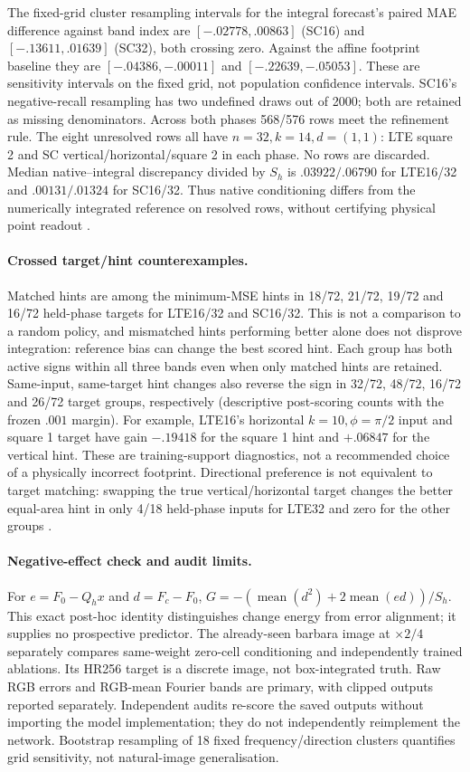 The fixed-grid cluster resampling intervals for the integral forecast's paired MAE difference against band index are $[-.02778,.00863]$ (SC16) and $[-.13611,.01639]$ (SC32), both crossing zero. Against the affine footprint baseline they are $[-.04386,-.00011]$ and $[-.22639,-.05053]$. These are sensitivity intervals on the fixed grid, not population confidence intervals. SC16's negative-recall resampling has two undefined draws out of 2000; both are retained as missing denominators. Across both phases 568/576 rows meet the refinement rule. The eight unresolved rows all have $n=32,k=14,d=(1,1)$: LTE square 2 and SC vertical/horizontal/square 2 in each phase. No rows are discarded. Median native--integral discrepancy divided by $S_h$ is $.03922/.06790$ for LTE16/32 and $.00131/.01324$ for SC16/32. Thus native conditioning differs from the numerically integrated reference on resolved rows, without certifying physical point readout .

\paragraph{Crossed target/hint counterexamples.}
Matched hints are among the minimum-MSE hints in 18/72, 21/72, 19/72 and 16/72 held-phase targets for LTE16/32 and SC16/32. This is not a comparison to a random policy, and mismatched hints performing better alone does not disprove integration: reference bias can change the best scored hint. Each group has both active signs within all three bands even when only matched hints are retained. Same-input, same-target hint changes also reverse the sign in 32/72, 48/72, 16/72 and 26/72 target groups, respectively (descriptive post-scoring counts with the frozen $.001$ margin). For example, LTE16's horizontal $k=10,\phi=\pi/2$ input and square 1 target have gain $-.19418$ for the square 1 hint and $+.06847$ for the vertical hint. These are training-support diagnostics, not a recommended choice of a physically incorrect footprint. Directional preference is not equivalent to target matching: swapping the true vertical/horizontal target changes the better equal-area hint in only 4/18 held-phase inputs for LTE32 and zero for the other groups .

\paragraph{Negative-effect check and audit limits.}
For $e=F_0-Q_hx$ and $d=F_c-F_0$, $G=-(\operatorname{mean}(d^2)+2\operatorname{mean}(ed))/S_h$. This exact post-hoc identity distinguishes change energy from error alignment; it supplies no prospective predictor. The already-seen barbara image at $\times 2/4$ separately compares same-weight zero-cell conditioning and independently trained ablations. Its HR256 target is a discrete image, not box-integrated truth. Raw RGB errors and RGB-mean Fourier bands are primary, with clipped outputs reported separately. Independent audits re-score the saved outputs without importing the model implementation; they do not independently reimplement the network. Bootstrap resampling of 18 fixed frequency/direction clusters quantifies grid sensitivity, not natural-image generalisation.

